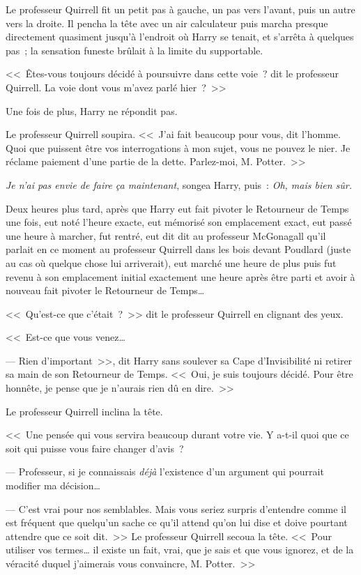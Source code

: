Le professeur Quirrell fit un petit pas à gauche, un pas vers l'avant, puis un autre vers la droite. Il pencha la tête avec un air calculateur puis marcha presque directement quasiment jusqu'à l'endroit où Harry se tenait, et s'arrêta à quelques pas~; la sensation funeste brûlait à la limite du supportable.

<<~Êtes-vous toujours décidé à poursuivre dans cette voie~? dit le professeur Quirrell. La voie dont vous m'avez parlé hier~?~>>

Une fois de plus, Harry ne répondit pas.

Le professeur Quirrell soupira. <<~J'ai fait beaucoup pour vous, dit l'homme. Quoi que puissent être vos interrogations à mon sujet, vous ne pouvez le nier. Je réclame paiement d'une partie de la dette. Parlez-moi, M. Potter.~>>

\emph{Je n'ai pas envie de faire ça maintenant}, songea Harry, puis~: \emph{Oh, mais bien sûr.}

\later

Deux heures plus tard, après que Harry eut fait pivoter le Retourneur de Temps une fois, eut noté l'heure exacte, eut mémorisé son emplacement exact, eut passé une heure à marcher, fut rentré, eut dit dit au professeur McGonagall qu'il parlait en ce moment au professeur Quirrell dans les bois devant Poudlard (juste au cas où quelque chose lui arriverait), eut marché une heure de plus puis fut revenu à son emplacement initial exactement une heure après être parti et avoir à nouveau fait pivoter le Retourneur de Temps…

\later

<<~Qu'est-ce que c'était~?~>> dit le professeur Quirrell en clignant des yeux.

<<~Est-ce que vous venez…

--- Rien d'important~>>, dit Harry sans soulever sa Cape d'Invisibilité ni retirer sa main de son Retourneur de Temps. <<~Oui, je suis toujours décidé. Pour être honnête, je pense que je n'aurais rien dû en dire.~>>

Le professeur Quirrell inclina la tête.

<<~Une pensée qui vous servira beaucoup durant votre vie. Y a-t-il quoi que ce soit qui puisse vous faire changer d'avis~?

--- Professeur, si je connaissais \emph{déjà} l'existence d'un argument qui pourrait modifier ma décision…

--- C'est vrai pour nos semblables. Mais vous seriez surpris d'entendre comme il est fréquent que quelqu'un sache ce qu'il attend qu'on lui dise et doive pourtant attendre que ce soit dit.~>> Le professeur Quirrell secoua la tête. <<~Pour utiliser vos termes… il existe un fait, vrai, que je sais et que vous ignorez, et de la véracité duquel j'aimerais vous convaincre, M. Potter.~>>

